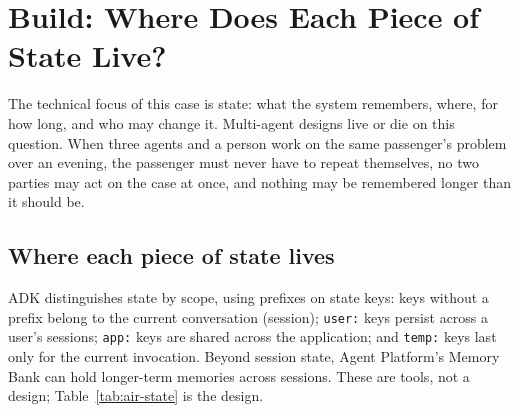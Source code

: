 
\section{Build: Where Does Each Piece of State Live?}
\label{sec:air-build}

The technical focus of this case is state: what the system remembers, where, for how long, and who may change it. Multi-agent designs live or die on this question. When three agents and a person work on the same passenger's problem over an evening, the passenger must never have to repeat themselves, no two parties may act on the case at once, and nothing may be remembered longer than it should be.

\subsection{Where each piece of state lives}

ADK distinguishes state by scope, using prefixes on state keys: keys without a prefix belong to the current conversation (session); \texttt{user:} keys persist across a user's sessions; \texttt{app:} keys are shared across the application; and \texttt{temp:} keys last only for the current invocation. Beyond session state, Agent Platform's Memory Bank can hold longer-term memories across sessions. These are tools, not a design; Table~\ref{tab:air-state} is the design.


